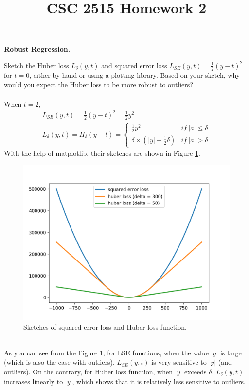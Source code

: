 \documentclass{myhw}
\title{CSC 2515 Homework 2}
\begin{document}
\begin{homeworkProblem}
\textbf{Robust Regression.}
\begin{homeworkSection}
Sketch the Huber loss $L_\delta(y,t)$ and squared error loss $L_{SE}(y,t) = \frac{1}{2}(y - t)^2$ for $t = 0$, either by hand or using a plotting library. Based on your sketch, why would you expect the Huber loss to be more robust to outliers? \\
\\
When $t=2$, 
\begin{gather*}
L_{SE}(y,t) = \frac{1}{2}(y - t)^2 = \frac{1}{2}y^2 \\
L_\delta(y,t) = H_\delta(y-t) = \left\{ 
	\begin{array}{lr} 
	\frac{1}{2}y^2 & if\ |a| \le \delta \\ 
	\delta \times (|y|-\frac{1}{2}\delta) & if\ |a| > \delta
	\end{array} \right.
\end{gather*}
With the help of matplotlib, their sketches are shown in Figure \ref{fig:q1.1}. 
\begin{figure}[h]
  \centering
  \includegraphics[width=.7\textwidth]{q1.png} 
  \caption{Sketches of squared error loss and Huber loss function. }
  \label{fig:q1.1}
\end{figure}
\\
As you can see from the Figure \ref{fig:q1.1}, for LSE functions, when the value $|y|$ is large (which is also the case with outliers), $L_{SE}(y,t)$ is very sensitive to $|y|$ (and outliers). 
On the contrary, for Huber loss function, when $|y|$ exceeds $\delta$, $L_\delta(y, t)$ increases linearly to $|y|$, which shows that it is relatively less sensitive to outliers.
\end{homeworkSection}
\begin{homeworkSection}

\end{homeworkSection}
\end{homeworkProblem}
\end{document}
